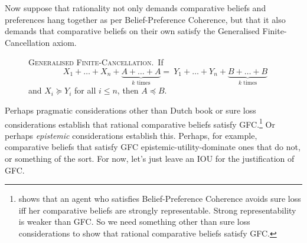 Now suppose that rationality not only demands comparative beliefs and preferences hang together as per Belief-Preference Coherence, but that it also demands that comparative beliefs on their own satisfy the Generalised Finite-Cancellation axiom.
\begin{description}
\item[] \textsc{Generalised Finite-Cancellation}.\, If
	$$
	  X_1+\ldots+X_n+\underbrace{A+\hdots+A}_{\text{$k$ times}} = \
	    Y_1+\ldots+Y_n+\underbrace{B+\hdots+B}_{\text{$k$ times}}
	$$
and $X_i\succeq Y_i$ for all $i\leq n$, then $A\preceq B$.
\end{description}
Perhaps pragmatic considerations other than Dutch book or sure loss considerations establish that rational comparative beliefs satisfy GFC.\footnote{\citet{Icard2016} shows that an agent who satisfies Belief-Preference Coherence avoids sure loss iff her comparative beliefs are strongly representable. Strong representability is weaker than GFC. So we need something other than sure loss considerations to show that rational comparative beliefs satisfy GFC.} Or perhaps \textit{epistemic} considerations establish this. Perhaps, for example, comparative beliefs that satisfy GFC epistemic-utility-dominate ones that do not, or something of the sort. For now, let's just leave an IOU for the justification of GFC.

